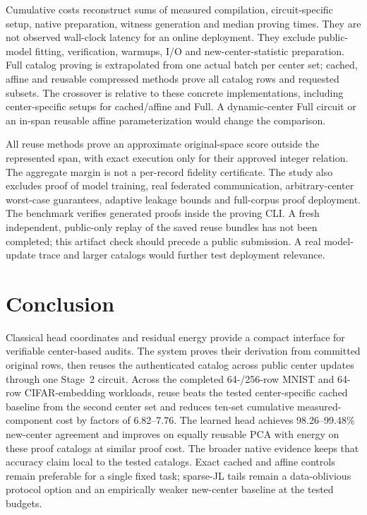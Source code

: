 Cumulative costs reconstruct sums of measured compilation, circuit-specific setup, native preparation, witness generation and median proving times. They are not observed wall-clock latency for an online deployment. They exclude public-model fitting, verification, warmups, I/O and new-center-statistic preparation. Full catalog proving is extrapolated from one actual batch per center set; cached, affine and reusable compressed methods prove all catalog rows and requested subsets. The crossover is relative to these concrete implementations, including center-specific setups for cached/affine and Full. A dynamic-center Full circuit or an in-span reusable affine parameterization would change the comparison.

All reuse methods prove an approximate original-space score outside the represented span, with exact execution only for their approved integer relation. The aggregate margin is not a per-record fidelity certificate. The study also excludes proof of model training, real federated communication, arbitrary-center worst-case guarantees, adaptive leakage bounds and full-corpus proof deployment. The benchmark verifies generated proofs inside the proving CLI. A fresh independent, public-only replay of the saved reuse bundles has not been completed; this artifact check should precede a public submission. A real model-update trace and larger catalogs would further test deployment relevance.

\section{Conclusion}\label{sec:conclusion}
Classical head coordinates and residual energy provide a compact interface for verifiable center-based audits. The system proves their derivation from committed original rows, then reuses the authenticated catalog across public center updates through one Stage~2 circuit. Across the completed 64-/256-row MNIST and 64-row CIFAR-embedding workloads, reuse beats the tested center-specific cached baseline from the second center set and reduces ten-set cumulative measured-component cost by factors of 6.82--7.76. The learned head achieves 98.26--99.48\% new-center agreement and improves on equally reusable PCA with energy on these proof catalogs at similar proof cost. The broader native evidence keeps that accuracy claim local to the tested catalogs. Exact cached and affine controls remain preferable for a single fixed task; sparse-JL tails remain a data-oblivious protocol option and an empirically weaker new-center baseline at the tested budgets.
